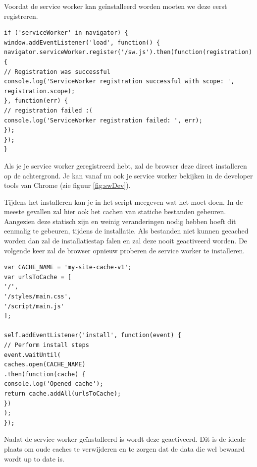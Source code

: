 	Voordat de service worker kan geïnstalleerd worden moeten we deze eerst registreren.
	
\begin{lstlisting}
if ('serviceWorker' in navigator) {
window.addEventListener('load', function() {
navigator.serviceWorker.register('/sw.js').then(function(registration) {
// Registration was successful
console.log('ServiceWorker registration successful with scope: ', registration.scope);
}, function(err) {
// registration failed :(
console.log('ServiceWorker registration failed: ', err);
});
});
}
\end{lstlisting}

Als je je service worker geregistreerd hebt, zal de browser deze direct installeren op de achtergrond. Je kan vanaf nu ook je service worker bekijken in de developer tools van Chrome (zie figuur \ref{fig:swDev}).

Tijdens het installeren kan je in het script meegeven wat het moet doen. In de meeste gevallen zal hier ook het cachen van statiche bestanden gebeuren. Aangezien deze statisch zijn en weinig veranderingen nodig hebben hoeft dit eenmalig te gebeuren, tijdens de installatie. Als bestanden niet kunnen gecached worden dan zal de installatiestap falen en zal deze nooit geactiveerd worden. De volgende keer zal de browser opnieuw proberen de service worker te installeren.
\begin{lstlisting}
var CACHE_NAME = 'my-site-cache-v1';
var urlsToCache = [
'/',
'/styles/main.css',
'/script/main.js'
];

self.addEventListener('install', function(event) {
// Perform install steps
event.waitUntil(
caches.open(CACHE_NAME)
.then(function(cache) {
console.log('Opened cache');
return cache.addAll(urlsToCache);
})
);
});
\end{lstlisting}


Nadat de service worker geïnstalleerd is wordt deze geactiveerd. Dit is de ideale plaats om oude caches te verwijderen en te zorgen dat de data die wel bewaard wordt up to date is.

